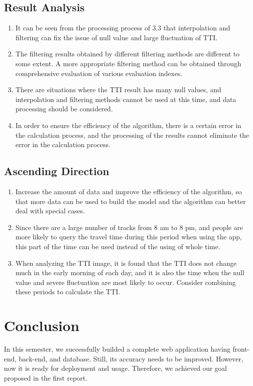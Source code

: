 \documentclass[fontset=none]{ctexart}
\theoremstyle{definition}
\theoremstyle{remark}
\begin{document}
\clearpage
\subsection{Result Analysis}
\begin{enumerate}
  \item It can be seen from the processing process of 3.3 that interpolation and filtering can fix the issue of null value and large fluctuation of TTI.
  \item The filtering results obtained by different filtering methods are different to some extent. A more appropriate filtering method can be obtained through comprehensive evaluation of various evaluation indexes.
  \item There are situations where the TTI result has many null values, and interpolation and filtering methods cannot be used at this time, and data processing should be considered.
  \item In order to ensure the efficiency of the algorithm, there is a certain error in the calculation process, and the processing of the results cannot eliminate the error in the calculation process.
\end{enumerate}

\subsection{Ascending Direction}
\begin{enumerate}
  \item Increase the amount of data and improve the efficiency of the algorithm, so that more data can be used to build the model and the algorithm can better deal with special cases.
  \item Since there are a large number of tracks from 8 am to 8 pm, and people are more likely to query the travel time during this period when using the app, this part of the time can be used instead of the using of whole time.
  \item When analyzing the TTI image, it is found that the TTI does not change much in the early morning of each day, and it is also the time when the null value and severe fluctuation are most likely to occur. Consider combining these periods to calculate the TTI.
\end{enumerate}

\clearpage
\section{Conclusion}
In this semester, we successfully builded a complete web application having front-end, back-end, and database. Still, its accuracy
needs to be improved. However, now it is ready for deployment and usage. Therefore, we achieved our goal proposed in the first report.
\end{document}
